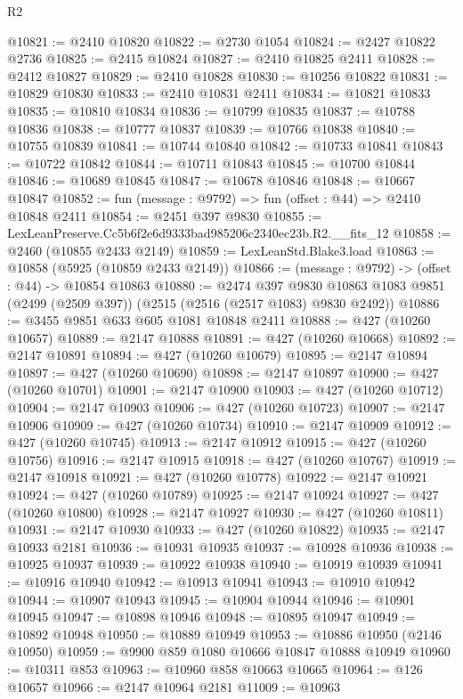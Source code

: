 \begin{lexlean}{R2}
\begin{coremodule}
@10821 := @2410 @10820
@10822 := @2730 @1054
@10824 := @2427 @10822 @2736
@10825 := @2415 @10824
@10827 := @2410 @10825 @2411
@10828 := @2412 @10827
@10829 := @2410 @10828
@10830 := @10256 @10822
@10831 := @10829 @10830
@10833 := @2410 @10831 @2411
@10834 := @10821 @10833
@10835 := @10810 @10834
@10836 := @10799 @10835
@10837 := @10788 @10836
@10838 := @10777 @10837
@10839 := @10766 @10838
@10840 := @10755 @10839
@10841 := @10744 @10840
@10842 := @10733 @10841
@10843 := @10722 @10842
@10844 := @10711 @10843
@10845 := @10700 @10844
@10846 := @10689 @10845
@10847 := @10678 @10846
@10848 := @10667 @10847
@10852 := fun (message : @9792) => fun (offset : @44) => @2410 @10848 @2411
@10854 := @2451 @397 @9830
@10855 := LexLeanPreserve.Cc5b6f2e6d9333bad985206c2340ec23b.R2.__fits_12
@10858 := @2460 (@10855 @2433 @2149)
@10859 := LexLeanStd.Blake3.load
@10863 := @10858 (@5925 (@10859 @2433 @2149))
@10866 := (message : @9792) -> (offset : @44) -> @10854 @10863
@10880 := @2474
    @397
    @9830
    @10863
    @1083
    @9851
    (@2499 (@2509 @397))
    (@2515 (@2516 (@2517 @1083) @9830 @2492))
@10886 := @3455 @9851 @633 @605 @1081 @10848 @2411
@10888 := @427 (@10260 @10657)
@10889 := @2147 @10888
@10891 := @427 (@10260 @10668)
@10892 := @2147 @10891
@10894 := @427 (@10260 @10679)
@10895 := @2147 @10894
@10897 := @427 (@10260 @10690)
@10898 := @2147 @10897
@10900 := @427 (@10260 @10701)
@10901 := @2147 @10900
@10903 := @427 (@10260 @10712)
@10904 := @2147 @10903
@10906 := @427 (@10260 @10723)
@10907 := @2147 @10906
@10909 := @427 (@10260 @10734)
@10910 := @2147 @10909
@10912 := @427 (@10260 @10745)
@10913 := @2147 @10912
@10915 := @427 (@10260 @10756)
@10916 := @2147 @10915
@10918 := @427 (@10260 @10767)
@10919 := @2147 @10918
@10921 := @427 (@10260 @10778)
@10922 := @2147 @10921
@10924 := @427 (@10260 @10789)
@10925 := @2147 @10924
@10927 := @427 (@10260 @10800)
@10928 := @2147 @10927
@10930 := @427 (@10260 @10811)
@10931 := @2147 @10930
@10933 := @427 (@10260 @10822)
@10935 := @2147 @10933 @2181
@10936 := @10931 @10935
@10937 := @10928 @10936
@10938 := @10925 @10937
@10939 := @10922 @10938
@10940 := @10919 @10939
@10941 := @10916 @10940
@10942 := @10913 @10941
@10943 := @10910 @10942
@10944 := @10907 @10943
@10945 := @10904 @10944
@10946 := @10901 @10945
@10947 := @10898 @10946
@10948 := @10895 @10947
@10949 := @10892 @10948
@10950 := @10889 @10949
@10953 := @10886 @10950 (@2146 @10950)
@10959 := @9900 @859 @1080 @10666 @10847 @10888 @10949
@10960 := @10311 @853
@10963 := @10960 @858 @10663 @10665
@10964 := @126 @10657
@10966 := @2147 @10964 @2181
@11009 := @10963

\end{coremodule}
\end{lexlean}
